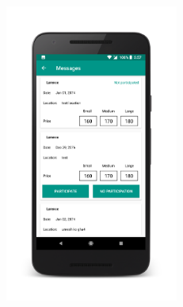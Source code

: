 \documentclass[aspectratio=169]{beamer}
\begin{document}
\begin{frame}
\begin{figure}[!h]
\begin{minipage}{.2\textwidth}
    \includegraphics[width=5.7cm]{vcc3.png}
  \end{minipage}
\end{figure}
\end{frame}
\end{document}

